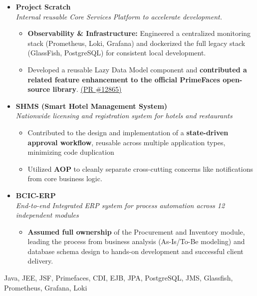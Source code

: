 \begin{experiences}
{\begin{itemize}[leftmargin=1.3em,label={}]
      \vspace{0.3em}
        \item \textbf{Project Scratch} \\
        {\small\textit{Internal reusable Core Services Platform to accelerate development.}}
        \begin{itemize}
          \item \textbf{Observability \& Infrastructure:} Engineered a centralized monitoring stack (Prometheus, Loki, Grafana) and dockerized the full legacy stack (GlassFish, PostgreSQL) for consistent local development.
          \item Developed a reusable Lazy Data Model component and \textbf{contributed a related feature enhancement to the official PrimeFaces open-source library}.
          \href{https://github.com/primefaces/primefaces/pull/12865}{(PR \#12865)}
        \end{itemize}

      \vspace{0.3em}
        \item \textbf{SHMS (Smart Hotel Management System)} \\
        {\small\textit{Nationwide licensing and registration system for hotels and restaurants }}
        \begin{itemize}
          \item Contributed to the design and implementation of a \textbf{state-driven approval workflow}, reusable across multiple application types, minimizing code duplication
          \item Utilized \textbf{AOP} to cleanly separate cross-cutting concerns like notifications from core business logic.
        \end{itemize}

      \vspace{0.3em}
        \item \textbf{BCIC-ERP} \\
        {\small\textit{End-to-end Integrated ERP system for process automation across 12 independent modules}}
        \begin{itemize}
          \item \textbf{Assumed full ownership} of the Procurement and Inventory module, leading the process from business analysis (As-Is/To-Be modeling) and database schema design to hands-on development and successful client delivery.
        \end{itemize}
      \end{itemize}
    }
    {Java, JEE, JSF, Primefaces, CDI, EJB, JPA, PostgreSQL, JMS, Glassfish, Prometheus, Grafana, Loki}
  \emptySeparator
\end{experiences}

